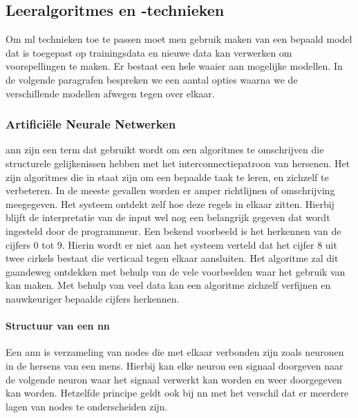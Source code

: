 	\subsection{Leeralgoritmes en -technieken}
	Om \gls{ml} technieken toe te passen moet men gebruik maken van een bepaald model dat is toegepast op trainingsdata en nieuwe data kan verwerken om voorspellingen te maken. Er bestaat een hele waaier aan mogelijke modellen. In de volgende paragrafen bespreken we een aantal opties waarna we de verschillende modellen afwegen tegen over elkaar.
	
		\subsubsection{Artifici\"ele Neurale Netwerken}
		\gls{ann} zijn een term dat gebruikt wordt om een algoritmes te omschrijven die structurele gelijkenissen hebben met het interconnectiepatroon van hersenen. Het zijn algoritmes die in staat zijn om een bepaalde taak te leren, en zichzelf te verbeteren. In de meeste gevallen worden er amper richtlijnen of omschrijving meegegeven. Het systeem ontdekt zelf hoe deze regels in elkaar zitten. Hierbij blijft de interpretatie van de input wel nog een belangrijk gegeven dat wordt ingesteld door de programmeur. Een bekend voorbeeld is het herkennen van de cijfers 0 tot 9. Hierin wordt er niet aan het systeem verteld dat het cijfer 8 uit twee cirkels bestaat die verticaal tegen elkaar aansluiten. Het algoritme zal dit gaandeweg ontdekken met behulp van de vele voorbeelden waar het gebruik van kan maken. Met behulp van veel data kan een algoritme zichzelf verfijnen en nauwkeuriger bepaalde cijfers herkennen.
		
			\paragraph{Structuur van een \gls{nn}}
			Een \gls{ann} is verzameling van nodes die met elkaar verbonden zijn zoals neuronen in de hersens van een mens. Hierbij kan elke neuron een signaal doorgeven naar de volgende neuron waar het signaal verwerkt kan worden en weer doorgegeven kan worden. Hetzelfde principe geldt ook bij \gls{nn} met het verschil dat er meerdere lagen van nodes te onderscheiden zijn. 
	

